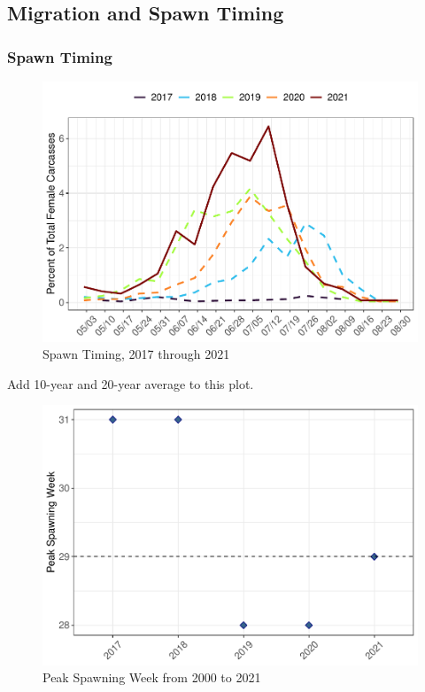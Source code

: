 \documentclass[
]{book}
\theoremstyle{definition}
\theoremstyle{definition}
\theoremstyle{definition}
\theoremstyle{definition}
\theoremstyle{remark}
\begin{document}
\hypertarget{migration-and-spawn-timing}{%
\subsection{Migration and Spawn Timing}\label{migration-and-spawn-timing}}

\hypertarget{spawn-timing}{%
\subsubsection{Spawn Timing}\label{spawn-timing}}

\begin{figure}
\centering
\includegraphics{_main_files/figure-latex/spawntiming-fig-1.pdf}
\caption{\label{fig:spawntiming-fig}Spawn Timing, 2017 through 2021}
\end{figure}

Add 10-year and 20-year average to this plot.

\begin{figure}
\centering
\includegraphics{_main_files/figure-latex/spawnweek-fig-1.pdf}
\caption{\label{fig:spawnweek-fig}Peak Spawning Week from 2000 to 2021}
\end{figure}
\end{document}
